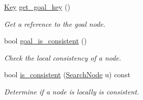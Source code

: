 \begin{DoxyCompactItemize}
\hyperlink{structhsearch_1_1Key}{Key} \hyperlink{classhsearch_1_1LPAStar_abffa3312bfb076a9c48ca40de32ec9b2}{get\+\_\+goal\+\_\+key} ()
\begin{DoxyCompactList}\small\item\em Get a reference to the goal node. \end{DoxyCompactList}\item 
bool \hyperlink{classhsearch_1_1LPAStar_a999387c32e95f4b00a9251c5adae4aa5}{goal\+\_\+is\+\_\+consistent} ()
\begin{DoxyCompactList}\small\item\em Check the local consistency of a node. \end{DoxyCompactList}\item 
bool \hyperlink{classhsearch_1_1LPAStar_a034b8a41e91d684932dd014139c4fcd1}{is\+\_\+consistent} (\hyperlink{structhsearch_1_1SearchNode}{Search\+Node} u) const
\begin{DoxyCompactList}\small\item\em Determine if a node is locally is consistent. \end{DoxyCompactList}\end{DoxyCompactItemize}
